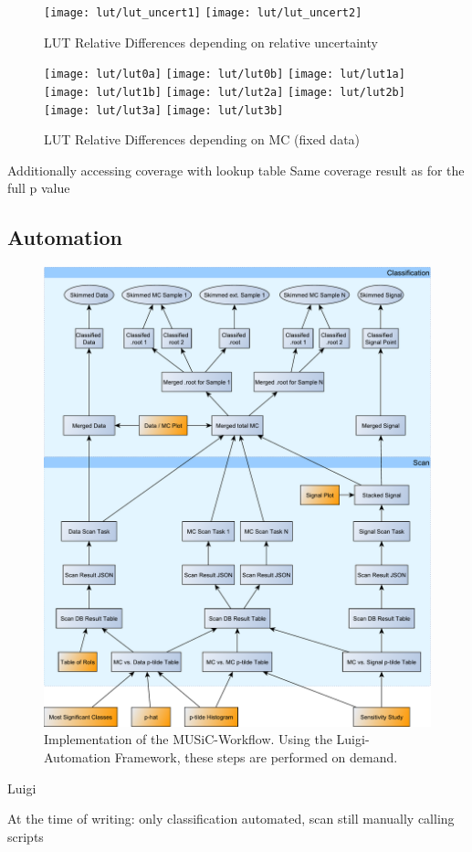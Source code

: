 \begin{figure}
    \centering
    \texttt{[image: lut/lut\_uncert1]}
    \texttt{[image: lut/lut\_uncert2]}
    \caption{LUT Relative Differences depending on relative uncertainty}
    \label{fig:lut_reldiff_reluncert}
\end{figure}

\begin{figure}
    \centering
    \texttt{[image: lut/lut0a]}
    \texttt{[image: lut/lut0b]}
    \texttt{[image: lut/lut1a]}
    \texttt{[image: lut/lut1b]}
     \texttt{[image: lut/lut2a]}
    \texttt{[image: lut/lut2b]}
    \texttt{[image: lut/lut3a]}  
    \texttt{[image: lut/lut3b]}
    \caption{LUT Relative Differences depending on MC (fixed data)}
    \label{fig:lut_reldiff_mc}
\end{figure}

Additionally accessing coverage with lookup table
Same coverage result as for the full p value



\subsection{Automation}
\begin{figure}
    \centering
    \includegraphics[width=\textwidth]{../music-workflow}
    \vspace{0.5em}
    \caption{Implementation of the MUSiC-Workflow. Using the Luigi-Automation Framework, these steps are performed on demand.}
    \label{fig:music_workflow}
\end{figure}

Luigi

At the time of writing: only classification automated, scan still manually calling scripts